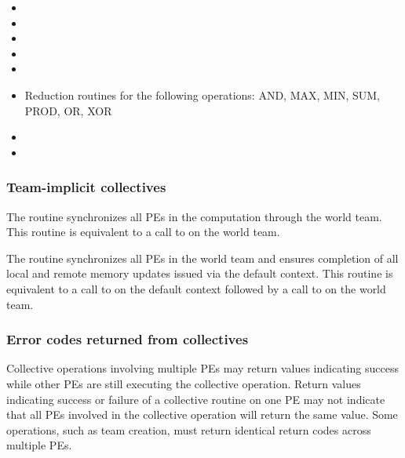 \begin{DeprecateBlock}
\begin{itemize}
\item {}
\item {}
\item {}
\item {}
\item {}
\item Reduction routines for the following operations: AND, MAX, MIN, SUM, PROD, OR, XOR
\item {}
\item {}
\end{itemize}

\end{DeprecateBlock}


\subsubsection*{Team-implicit collectives}

The  routine synchronizes all \acp{PE} in the
computation through the world team. This routine is equivalent to a
call to  on the world team.

The  routine synchronizes all \acp{PE} in
the world team and ensures completion of all local and remote memory
updates issued via the default context.  This routine is equivalent to
a call to  on the default context followed by a
call to  on the world team.

\subsubsection*{Error codes returned from collectives}

Collective operations involving multiple \acp{PE} may return values
indicating success while other \acp{PE} are still executing the
collective operation. Return values indicating success or failure of a
collective routine on one \ac{PE} may not indicate that all \acp{PE}
involved in the collective operation will return the same value. Some
operations, such as team creation, must return identical return codes
across multiple \acp{PE}.
